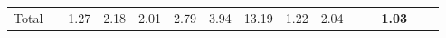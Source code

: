 \begin{tabular}{ll|rrrrrr|rrrrrrr}
  \hline
  Total  & &



  


  
  1.27 & 2.18 & 2.01 & 2.79 & 3.94 & 13.19 & 1.22 & 2.04 &  &  & \textbf{1.03} \\


\end{tabular}
